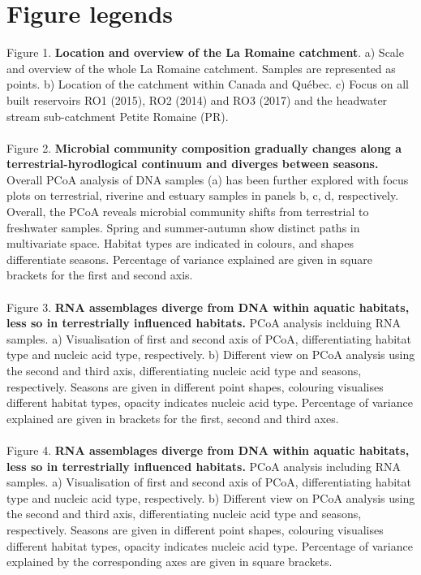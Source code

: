 \documentclass[12pt,a4paper]{article} %
\begin{document}
\newpage
\singlespacing



\newpage
\section*{Figure legends}
Figure 1. \textbf{Location and overview of the La Romaine catchment}. a) Scale and overview of the whole La Romaine catchment. Samples are represented as points. b) Location of the catchment within Canada and Québec. c) Focus on all built reservoirs RO1 (2015), RO2 (2014) and RO3 (2017) and the headwater stream sub-catchment Petite Romaine (PR).\\
\\
Figure 2. \textbf{Microbial community composition gradually changes along a terrestrial-hyrodlogical continuum and diverges between seasons.} Overall PCoA analysis of DNA samples (a) has been further explored with focus plots on terrestrial, riverine and estuary samples in panels b, c, d, respectively. Overall, the PCoA reveals microbial community shifts from terrestrial to freshwater samples. Spring and summer-autumn show distinct paths in multivariate space. Habitat types are indicated in colours, and shapes differentiate seasons. Percentage of variance explained are given in square brackets for the first and second axis. \\
\\
Figure 3. \textbf{RNA assemblages diverge from DNA within aquatic habitats, less so in terrestrially influenced habitats.} PCoA analysis inclduing RNA samples. a) Visualisation of first and second axis of PCoA, differentiating habitat type and nucleic acid type, respectively. b) Different view on PCoA analysis using the second and third axis, differentiating nucleic acid type and seasons, respectively. Seasons are given in different point shapes, colouring visualises different habitat types, opacity indicates nucleic acid type. Percentage of variance explained are given in brackets for the first, second and third axes. \\
\\
Figure 4. \textbf{RNA assemblages diverge from DNA within aquatic habitats, less so in terrestrially influenced habitats.} PCoA analysis including RNA samples. a) Visualisation of first and second axis of PCoA, differentiating habitat type and nucleic acid type, respectively. b) Different view on PCoA analysis using the second and third axis, differentiating nucleic acid type and seasons, respectively. Seasons are given in different point shapes, colouring visualises different habitat types, opacity indicates nucleic acid type. Percentage of variance explained by the corresponding axes are given in square brackets. \\
\end{document}
